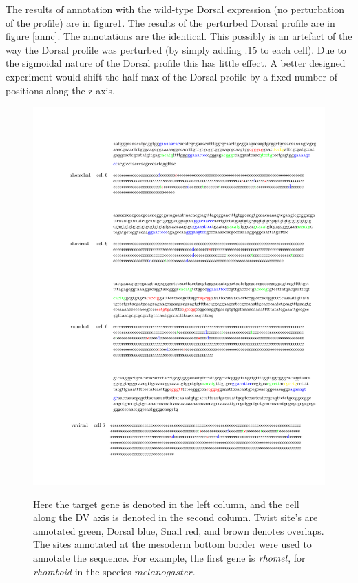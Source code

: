 The results of annotation with the wild-type Dorsal expression (no perturbation of the profile) are in figure\ref{annb}.  The results of the perturbed Dorsal profile are in figure \ref{annc}.  The annotations are the identical.  This possibly is an artefact of the way the Dorsal profile was perturbed (by simply adding .15 to each cell).  Due to the sigmoidal nature of the Dorsal profile this has little effect.  A better designed experiment would shift the half max of the Dorsal profile by a fixed number of positions along the z axis.


%
\begin{figure}
  \includegraphics[height=1\textwidth]{annb}\\
  \caption{Here the target gene is denoted in the left column, and the cell along the DV axis is denoted in the second column.  Twist site's are annotated green, Dorsal blue, Snail red, and brown denotes overlaps.  The sites annotated at the mesoderm bottom border were used to annotate the sequence.  For example, the first gene is $\emph{rhomel}$, for \textit{rhomboid} in the species $melanogaster$. }\label{annb}
\end{figure}

